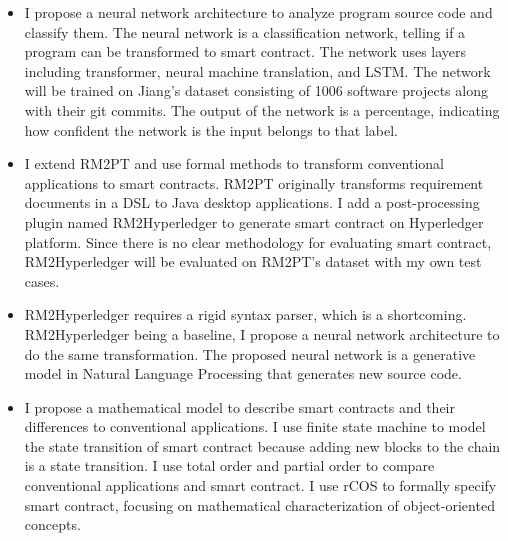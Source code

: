 \begin{itemize}
\item  I propose a neural network architecture to analyze program source code and classify them. The neural network is a classification network, telling if a program can be transformed to smart contract.
The network uses layers including transformer, neural machine translation, and LSTM. The network will be trained on Jiang's dataset consisting of \num{1006} software projects along with their git commits.
The output of the network is a percentage, indicating how confident the network is the input belongs to that label.
\item I extend RM2PT and use formal methods to transform conventional applications to smart contracts. RM2PT originally transforms requirement documents in a DSL to Java desktop applications.
I add a post-processing plugin named RM2Hyperledger to generate smart contract on Hyperledger platform.
Since there is no clear methodology for evaluating smart contract, RM2\-Hyperledger will be evaluated on RM2PT's dataset with my own test cases.

\item RM2Hyperledger requires a rigid syntax parser, which is a shortcoming. RM2\-Hyperledger being a baseline, I propose a neural network architecture to do the same transformation.
The proposed neural network is a generative model in Natural Language Processing that generates new source code.
\item I propose a mathematical model to describe smart contracts and their differences to conventional applications.
I use finite state machine to model the state transition of smart contract because adding new blocks to the chain is a state transition.
I use total order and partial order to compare conventional applications and smart contract.
I use rCOS to formally specify smart contract, focusing on mathematical characterization of object-oriented concepts.

\end{itemize}


